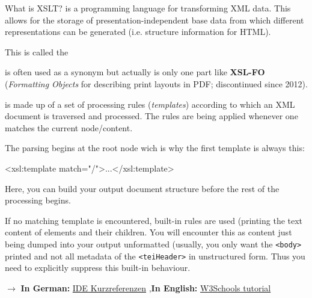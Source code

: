 \begin{frame}{What is XSLT?}
\small 
{} is a programming language for transforming XML data. This allows for the storage of presentation-independent base data from which different representations can be generated (i.e. structure information for HTML).

This is called the 


is often used as a synonym but actually is only one part like \textbf{XSL-FO} (\emph{Formatting Objects} for describing print layouts in PDF; discontinued since 2012). 

 is made up of a set of processing rules (\emph{templates}) according to which an XML document is traversed and processed.
The rules are being applied whenever one matches the current node/content. 

\framebreak

The parsing begins at the root node wich is why the first template is always this:
\begin{xmlcode}
<xsl:template match="/">...</xsl:template>
\end{xmlcode}
Here, you can build your output document structure before the rest of the processing begins. 

If no matching template is encountered, built-in rules are used (printing the text content of elements and their children. You will encounter this as content just being dumped into your output unformatted (usually, you only want the \texttt{<body>} printed and not all metadata of the \texttt{<teiHeader>} in unstructured form. Thus you need to explicitly suppress this built-in behaviour. 

$\to$ \textbf{In German:} \href{https://www.i-d-e.de/?s=referenz}{IDE Kurzreferenzen} \sep \textbf{In English:} \href{https://www.w3schools.com/xml/xsl_intro.asp}{W3Schools tutorial}

\end{frame}


